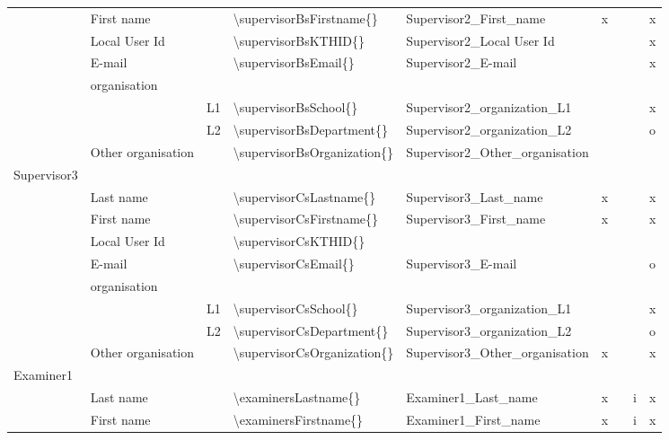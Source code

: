 \begin{landscape}
{\begin{longtable}{L{2cm}|L{4cm}|l|L{4cm}|L{4cm}|l l l l|}
 & First name &  & \textbackslash supervisorBsFirstname\{\} & Supervisor2\_First\_name & x &  &  & x \\
 & Local User Id &  & \textbackslash supervisorBsKTHID\{\} & Supervisor2\_Local User Id &  &  &  & x \\
 & E-mail &  & \textbackslash supervisorBsEmail\{\} & Supervisor2\_E-mail &  &  &  & x \\
 & organisation & \\
 &  & L1 & \textbackslash supervisorBsSchool\{\} & Supervisor2\_organization\_L1 &  &  &  & x \\
 &  & L2 & \textbackslash supervisorBsDepartment\{\} & Supervisor2\_organization\_L2 &  &  &  & o \\
 & Other organisation &  & \textbackslash supervisorBsOrganization\{\} & Supervisor2\_Other\_organisation &  &  &  & \\
Supervisor3 &  \\
 & Last name &  & \textbackslash supervisorCsLastname\{\} & Supervisor3\_Last\_name & x &  &  & x \\
 & First name &  & \textbackslash supervisorCsFirstname\{\} & Supervisor3\_First\_name & x &  &  & x \\
 & Local User Id &  & \textbackslash supervisorCsKTHID\{\} &  &  &  &  & \\ 
 & E-mail &  & \textbackslash supervisorCsEmail\{\} & Supervisor3\_E-mail &  &  &  & o \\
 & organisation & \\ 
 &  & L1 & \textbackslash supervisorCsSchool\{\} & Supervisor3\_organization\_L1 &  &  &  & x \\
 &  & L2 & \textbackslash supervisorCsDepartment\{\} & Supervisor3\_organization\_L2 &  &  &  & o \\
 & Other organisation &  & \textbackslash supervisorCsOrganization\{\} & Supervisor3\_Other\_organisation & x &  &  &  x \\
Examiner1 & \\
 & Last name &  & \textbackslash examinersLastname\{\} & Examiner1\_Last\_name & x &  & i & x \\
 & First name &  & \textbackslash examinersFirstname\{\} & Examiner1\_First\_name & x &  & i & x \\

\end{longtable}}
\end{landscape}
